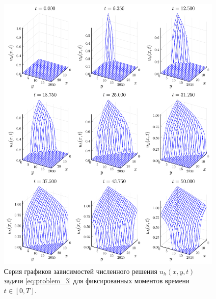 \begin{figure}
    \centering
    \includegraphics[width=\textwidth, keepaspectratio]{Разностные_схемы_на_статических_сетках/Программный_код_примеры_расчётов/explicit_scheme/problem_3_loc_wireframe.pdf}
    \caption{Серия графиков зависимостей численного решения $u_h(x, y, t)$ задачи \eqref{eq:problem_3} для фиксированных моментов времени $t \in [0, T]$.}
    \label{fig:problem_3_wireframe}
\end{figure}
